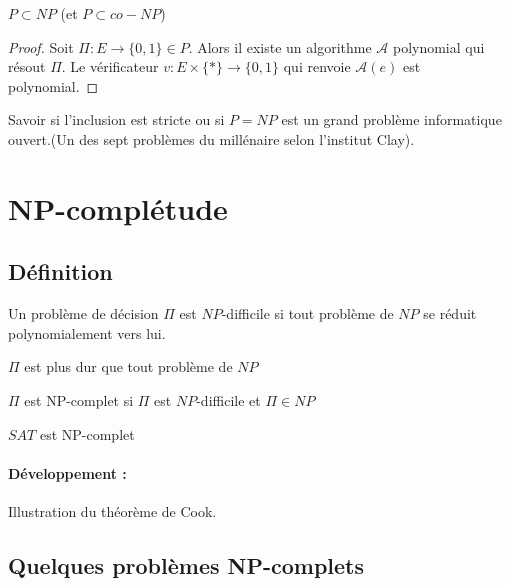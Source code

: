 \begin{proposition}
	$P \subset NP$ (et $P \subset co-NP$)
\end{proposition}

\begin{proof}
	Soit $\Pi : E \to \{0, 1\} \in P$. Alors il existe un algorithme $\mathcal A$ polynomial qui résout $\Pi$. Le vérificateur $v: E\times\{*\} \to \{0, 1\}$ qui renvoie $\mathcal A(e)$ est polynomial. 
\end{proof}

\begin{rem}
	Savoir si l'inclusion est stricte ou si $P = NP$ est un grand problème informatique ouvert.(Un des sept problèmes du millénaire selon l'institut Clay).
\end{rem}

\section{NP-complétude}

\subsection{Définition}

\begin{definition}
	Un problème de décision $\Pi$ est $NP$-difficile si tout problème de $NP$ se réduit polynomialement vers lui.
\end{definition}

\begin{idee}
	$\Pi$ est plus dur que tout problème de $NP$
\end{idee}

\begin{definition}
	$\Pi$ est NP-complet si $\Pi$ est $NP$-difficile et $\Pi \in NP$
\end{definition}

\begin{theorem}
	$SAT$ est NP-complet
\end{theorem}

\paragraph{Développement :} Illustration du théorème de Cook.

\subsection{Quelques problèmes NP-complets}

